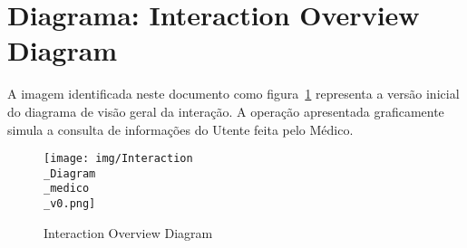 
\section{Diagrama: Interaction Overview Diagram}
\begin{minipage}{\linewidth}
A imagem identificada neste documento como figura~\ref{fig:iod3140} representa a versão inicial do diagrama de visão geral da interação. A operação apresentada graficamente simula a consulta de informações do Utente feita pelo Médico.
\end{minipage}

\begin{figure}[htb]
	\centering
	\texttt{[image: img/Interaction\\\_Diagram\\\_medico\\\_v0.png]}  %
	\caption{Interaction Overview Diagram}
	\label{fig:iod3140}
\end{figure}


